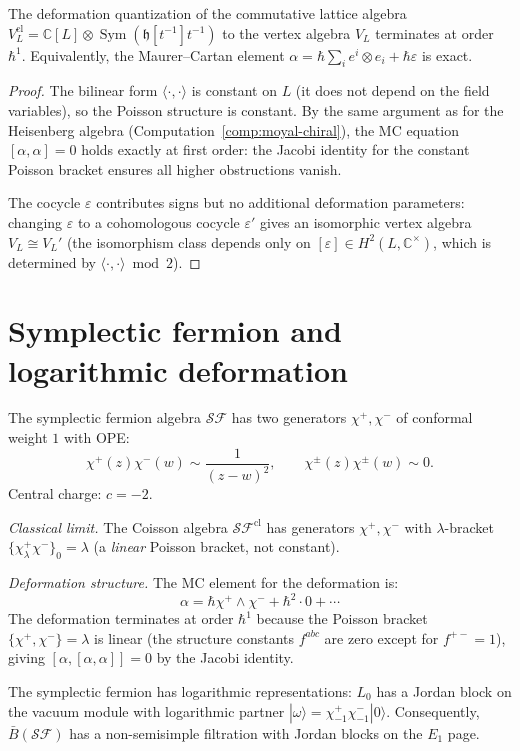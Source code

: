 \begin{proposition}
\label{prop:lattice-one-step}
The deformation quantization of the commutative lattice algebra
$V_L^{\mathrm{cl}} = \mathbb{C}[L] \otimes \operatorname{Sym}(\mathfrak{h}[t^{-1}]t^{-1})$
to the vertex algebra $V_L$ terminates at order $\hbar^1$.
Equivalently, the Maurer--Cartan element
$\alpha = \hbar \sum_i e^i \otimes e_i + \hbar \varepsilon$
is exact.
\end{proposition}

\begin{proof}
The bilinear form $\langle \cdot, \cdot \rangle$ is constant on $L$
(it does not depend on the field variables), so the Poisson structure
is constant.  By the same argument as for the Heisenberg algebra
(Computation~\ref{comp:moyal-chiral}), the MC equation $[\alpha, \alpha] = 0$
holds exactly at first order: the Jacobi identity for the constant
Poisson bracket ensures all higher obstructions vanish.

The cocycle $\varepsilon$ contributes signs but no additional deformation
parameters: changing $\varepsilon$ to a cohomologous cocycle $\varepsilon'$
gives an isomorphic vertex algebra $V_L \cong V_L'$ (the isomorphism
class depends only on $[\varepsilon] \in H^2(L, \mathbb{C}^\times)$,
which is determined by $\langle \cdot, \cdot \rangle \bmod 2$).
\end{proof}


\section{Symplectic fermion and logarithmic deformation}
\label{sec:symplectic-fermion-deformation}

\begin{computation}
\label{comp:symplectic-fermion-dq}

The symplectic fermion algebra $\mathcal{SF}$ has two generators
$\chi^+, \chi^-$ of conformal weight $1$ with OPE:
\[
\chi^+(z) \chi^-(w) \sim \frac{1}{(z-w)^2}, \qquad
\chi^\pm(z) \chi^\pm(w) \sim 0.
\]
Central charge: $c = -2$.

\emph{Classical limit.}
The Coisson algebra $\mathcal{SF}^{\mathrm{cl}}$ has generators
$\chi^+, \chi^-$ with $\lambda$-bracket
$\{\chi^+_\lambda \chi^-\}_0 = \lambda$ (a \emph{linear}
Poisson bracket, not constant).

\emph{Deformation structure.}
The MC element for the deformation is:
\[
\alpha = \hbar \chi^+ \wedge \chi^-
+ \hbar^2 \cdot 0 + \cdots
\]
The deformation terminates at order $\hbar^1$ because the
Poisson bracket $\{\chi^+, \chi^-\} = \lambda$ is linear
(the structure constants $f^{abc}$ are zero except for
$f^{+-} = 1$), giving $[\alpha, [\alpha, \alpha]] = 0$ by
the Jacobi identity.

The symplectic fermion has logarithmic representations: $L_0$ has a Jordan block on the vacuum module with logarithmic partner $|\omega\rangle = \chi^+_{-1}\chi^-_{-1}|0\rangle$.  Consequently, $\bar{B}(\mathcal{SF})$ has a non-semisimple filtration with Jordan blocks on the $E_1$ page.
\end{computation}

